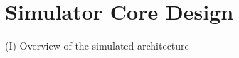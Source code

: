 \documentclass[conference, 10pt]{IEEEtran}
\begin{document}
\section{Simulator Core Design}
\label{sec:core-design}


(I) Overview of the simulated architecture

\end{document}
